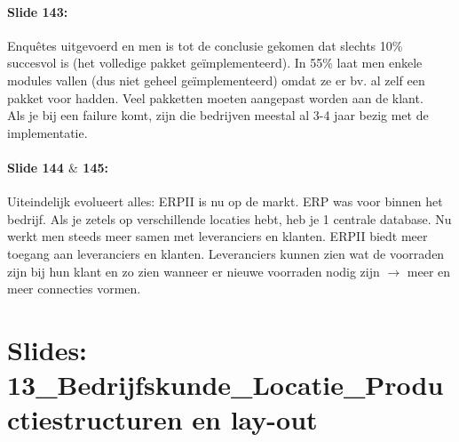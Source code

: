 \documentclass[10pt,a4paper]{report}
\begin{document}
\paragraph{Slide 143:} Enqu\^etes uitgevoerd en men is tot de conclusie gekomen dat slechts 10\% succesvol is (het volledige pakket ge\"implementeerd). In 55\% laat men enkele modules vallen (dus niet geheel ge\"implementeerd) omdat ze er bv. al zelf een pakket voor hadden. Veel pakketten moeten aangepast worden aan de klant.\\
Als je bij een failure komt, zijn die bedrijven meestal al 3-4 jaar bezig met de implementatie.

\paragraph{Slide 144 $\&$ 145:} Uiteindelijk evolueert alles: ERPII is nu op de markt. ERP was voor binnen het bedrijf. Als je zetels op verschillende locaties hebt, heb je 1 centrale database. Nu werkt men steeds meer samen met leveranciers en klanten. ERPII biedt meer toegang aan leveranciers en klanten. Leveranciers kunnen zien wat de voorraden zijn bij hun klant en zo zien wanneer er nieuwe voorraden nodig zijn $\rightarrow$ meer en meer connecties vormen.

\section{Slides: 13\_Bedrijfskunde\_Locatie\_Productiestructuren en lay-out}
\end{document}
